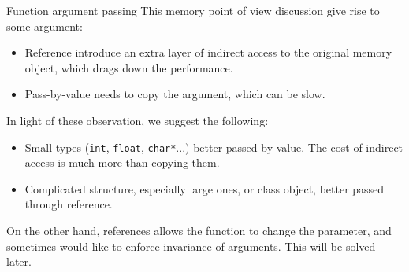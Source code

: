 \begin{frame}{Function argument passing}
This memory point of view discussion give rise to some argument:
\begin{itemize}
	\item Reference introduce an extra layer of indirect access to the original memory object, which drags down the performance.
	\item Pass-by-value needs to copy the argument, which can be slow.
\end{itemize}

In light of these observation, we suggest the following:

\begin{itemize}
	\item Small types (\texttt{int}, \texttt{float}, \texttt{char*}...) better passed by value. The cost of indirect access is much more than copying them.
	\item Complicated structure, especially large ones, or class object, better passed through reference.
\end{itemize}

On the other hand, references allows the function to change the parameter, and sometimes would like to enforce invariance of arguments. This will be solved later.
\end{frame}

